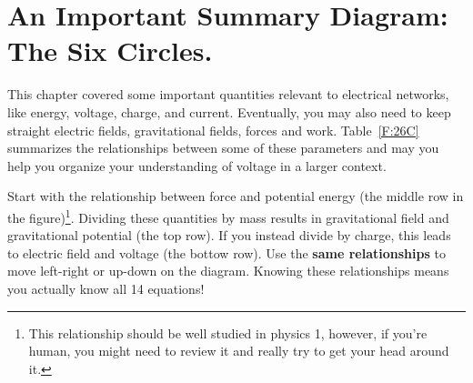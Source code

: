 \section{An Important Summary Diagram: The Six Circles.}
This chapter covered some important quantities relevant to electrical networks, like energy, voltage, charge, and current. Eventually, you may also need to keep straight electric fields, gravitational fields, forces and work. Table~\ref{F:26C} summarizes the relationships between some of these parameters and may you help you organize your understanding of voltage in a larger context.
\par
Start with the relationship between force and potential energy (the middle row in the figure)\footnote{This relationship should be well studied in physics 1, however, if you're human, you might need to review it and really try to get your head around it.}. Dividing these quantities by mass results in gravitational field and gravitational potential (the top row). If you instead divide by charge, this leads to electric field and voltage (the bottow row). Use the \textbf{same relationships} to move left-right or up-down on the diagram. Knowing these relationships means you actually know all 14 equations!
\par
